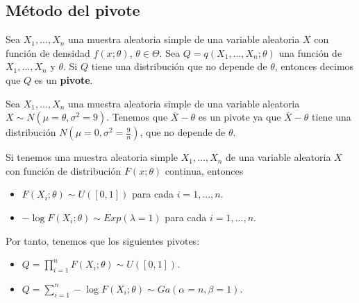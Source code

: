 \subsection{Método del pivote}

\begin{defi}
Sea $X_1,...,X_n$ una muestra aleatoria simple de una variable aleatoria $X$ con función de densidad $f(x;\theta)$, $\theta \in \Theta$. Sea $Q = q(X_1,...,X_n;\theta)$ una función de $X_1,...,X_n$ y $\theta$. Si $Q$ tiene una distribución que no depende de $\theta$, entonces decimos que $Q$ es un \textbf{pivote}.
\end{defi}

\begin{ejemplo}
Sea $X_1,...,X_n$ una muestra aleatoria simple de una variable aleatoria $X \sim N(\mu = \theta,\sigma^2 =9)$. Tenemos que $\overline{X} - \theta$ es un pivote ya que $\overline{X} - \theta$ tiene una distribución $N\left(\mu = 0, \sigma^2 = \frac{9}{n}\right)$, que no depende de $\theta$.
\end{ejemplo}

\begin{obs}
Si tenemos una muestra aleatoria simple $X_1,...,X_n$ de una variable aleatoria $X$ con función de distribución $F(x;\theta)$ continua, entonces
\begin{itemize}
    \item $F(X_i;\theta) \sim U([0,1])$ para cada $i= 1,...,n$.
    \item $-\log F(X_i;\theta) \sim Exp(\lambda = 1)$ para cada $i= 1,...,n$.
\end{itemize}
Por tanto, tenemos que los siguientes pivotes:
\begin{itemize}
    \item $Q = \prod_{i=1}^{n} F(X_i;\theta) \sim U([0,1])$.
    \item $Q = \sum_{i=1}^{n} - \log F(X_i;\theta) \sim Ga(\alpha = n, \beta = 1)$.
\end{itemize}
\end{obs}

